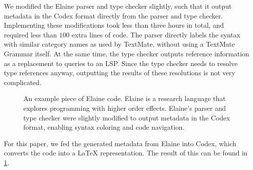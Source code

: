We modified the Elaine parser and type checker slightly, such that it output metadata in the Codex format directly from the parser and type checker.
Implementing these modifications took less than three hours in total, and required less than $100$ extra lines of code.
The parser directly labels the syntax with similar category names as used by TextMate, without using a TextMate Grammar itself.
At the same time, the type checker outputs reference information as a replacement to queries to an \ac{LSP}.
Since the type checker needs to resolve type references anyway, outputting the results of these resolutions is not very complicated.

\begin{figure}
    \centering
    \codePaperExampleElaine
    \caption{An example piece of Elaine code. Elaine is a research language that explores programming with higher order effects. Elaine's parser and type checker were slightly modified to output metadata in the Codex format, enabling syntax coloring and code navigation. }
    \label{fig:elaine}
\end{figure}



For this paper, we fed the generated metadata from Elaine into Codex, which converts the code into a LaTeX representation.
The result of this can be found in \cref{fig:elaine}.
